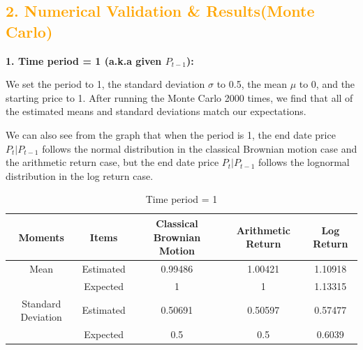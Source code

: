 \documentclass[11pt,en]{elegantpaper}
\begin{document}
\subsection*{\textcolor{orange}{2. Numerical Validation \& Results(Monte Carlo)}}

\textbf{1. Time period = 1 (a.k.a given $P_{t-1}$):}

We set the period to 1, the standard deviation $\sigma$ to 0.5, the mean $\mu$ to 0, and the starting price to 1. After running the Monte Carlo 2000 times, we find that all of the estimated means and standard deviations match our expectations. 

We can also see from the graph that when the period is 1, the end date price $P_t|P_{t-1}$ follows the normal distribution in the classical Brownian motion case and the arithmetic return case, but the end date price $P_t|P_{t-1}$ follows the lognormal distribution in the log return case.

\begin{table}[htbp]
    \centering
    \caption{Time period = 1}
    \begin{tabular}{@{}ccccc@{}}
        \toprule
        \textbf{Moments} & \textbf{Items} & \textbf{Classical Brownian Motion} & \textbf{Arithmetic Return} & \textbf{Log Return}\\
        \midrule
        Mean & Estimated  & 0.99486 & 1.00421 & 1.10918 \\
        & Expected  & 1       & 1       & 1.13315 \\
        Standard Deviation& Estimated  & 0.50691 & 0.50597 & 0.57477 \\
        & Expected & 0.5     & 0.5     & 0.6039 \\
        \bottomrule
    \end{tabular}
\end{table}
\end{document}
